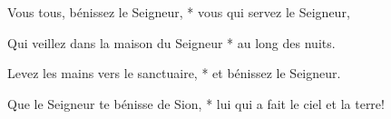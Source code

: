 \item Vous tous, bénissez le Seigneur, * vous qui servez le Seigneur,
\item Qui veillez dans la maison du Seigneur * au long des nuits.
\item Levez les mains vers le sanctuaire, * et bénissez le Seigneur.
\item Que le Seigneur te bénisse de Sion, * lui qui a fait le ciel et la terre!
